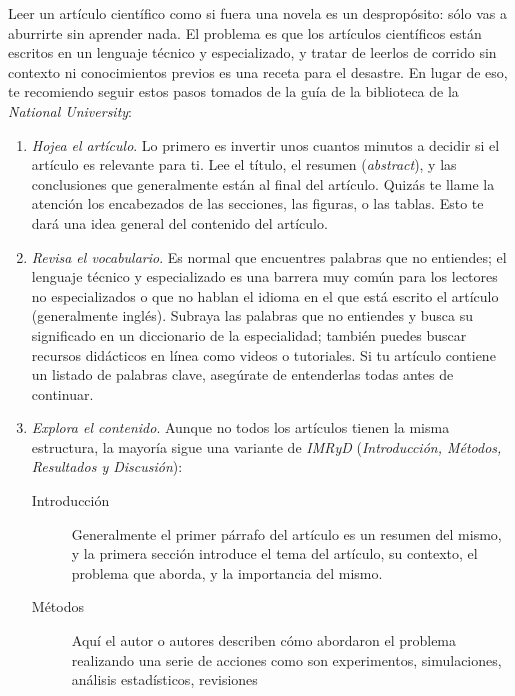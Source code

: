 Leer un artículo científico como si fuera una novela es un despropósito: sólo
vas a aburrirte sin aprender nada.
El problema es que los artículos científicos están escritos en un lenguaje
técnico y especializado, y tratar de leerlos de corrido sin contexto ni
conocimientos previos es una receta para el desastre.
En lugar de eso, te recomiendo seguir estos pasos tomados de la guía de la
biblioteca de la \emph{National University}\cite{NationalUniversity2024}:

\begin{enumerate}
    \item \emph{Hojea el artículo}. Lo primero es invertir unos cuantos minutos
          a decidir si el artículo es relevante para ti.
          Lee el título, el resumen (\emph{abstract}), y las conclusiones que
          generalmente están al final del artículo.
          Quizás te llame la atención los encabezados de las secciones, las
          figuras, o las tablas.
          Esto te dará una idea general del contenido del artículo.
    \item \emph{Revisa el vocabulario}. Es normal que encuentres palabras que no
          entiendes; el lenguaje técnico y especializado es una barrera muy común
          para los lectores no especializados o que no hablan el idioma en el que
          está escrito el artículo (generalmente inglés).
          Subraya las palabras que no entiendes y busca su significado en un
          diccionario de la especialidad; también puedes buscar recursos
          didácticos en línea como videos o tutoriales.
          Si tu artículo contiene un listado de palabras clave, asegúrate de
          entenderlas todas antes de continuar.
    \item \emph{Explora el contenido}. Aunque no todos los artículos tienen la
          misma estructura, la mayoría sigue una variante de \emph{IMRyD}
          (\emph{Introducción, Métodos, Resultados y Discusión}):
          \begin{description}
              \item[Introducción] Generalmente el primer párrafo del artículo es
                  un resumen del mismo, y la primera sección introduce el tema
                  del artículo, su contexto, el problema que aborda, y la
                  importancia del mismo.
              \item[Métodos] Aquí el autor o autores describen cómo abordaron el
                  problema realizando una serie de acciones como son
                  experimentos, simulaciones, análisis estadísticos, revisiones

\end{description}
\end{enumerate}
